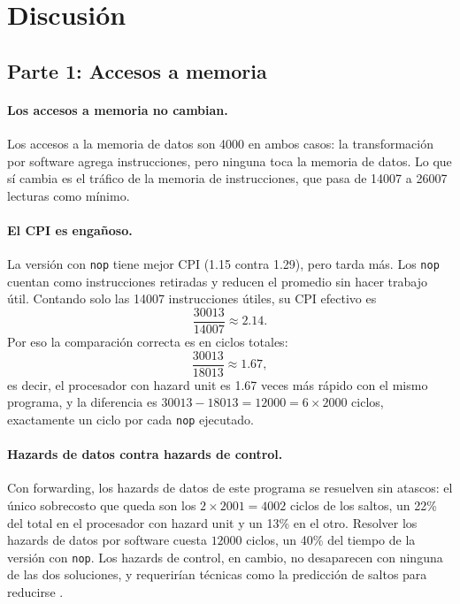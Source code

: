 \documentclass[11pt,a4paper]{article}
\begin{document}
\section{Discusi\'on}

\subsection{Parte 1: Accesos a memoria}

\paragraph{Los accesos a memoria no cambian.}
Los accesos a la memoria de datos son 4000 en ambos casos: la transformaci\'on
por software agrega instrucciones, pero ninguna toca la memoria de datos. Lo
que s\'i cambia es el tr\'afico de la memoria de instrucciones, que pasa de
14007 a 26007 lecturas como m\'inimo.

\paragraph{El CPI es enga\~noso.}
La versi\'on con \texttt{nop} tiene mejor CPI (1.15 contra 1.29), pero tarda m\'as.
Los \texttt{nop} cuentan como instrucciones retiradas y reducen el promedio sin
hacer trabajo \'util. Contando solo las 14007 instrucciones \'utiles, su CPI
efectivo es
\begin{equation}
  \frac{30013}{14007} \approx 2.14 .
\end{equation}
Por eso la comparaci\'on correcta es en ciclos totales:
\begin{equation}
  \frac{30013}{18013} \approx 1.67 ,
\end{equation}
es decir, el procesador con hazard unit es 1.67 veces m\'as r\'apido con el mismo
programa, y la diferencia es $30013 - 18013 = 12000 = 6 \times 2000$ ciclos,
exactamente un ciclo por cada \texttt{nop} ejecutado.

\paragraph{Hazards de datos contra hazards de control.}
Con forwarding, los hazards de datos de este programa se resuelven sin
atascos: el \'unico sobrecosto que queda son los $2 \times 2001 = 4002$ ciclos de
los saltos, un 22\% del total en el procesador con hazard unit y un 13\% en el
otro. Resolver los hazards de datos por software cuesta $12000$ ciclos, un
40\% del tiempo de la versi\'on con \texttt{nop}. Los hazards de control, en
cambio, no desaparecen con ninguna de las dos soluciones, y requerir\'ian
t\'ecnicas como la predicci\'on de saltos para reducirse
\cite{harris,patterson}.
\end{document}
